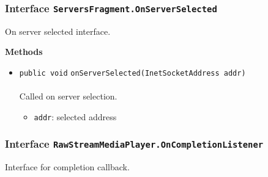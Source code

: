 \subsubsection{Interface \lstinline|ServersFragment.OnServerSelected|}
On server selected interface. \\
\noindent\begin{minipage}[t]{5cm}
\vspace{0.3em}
\hspace*{2em}
\vspace{0.3em}
\end{minipage}





\textbf{\sffamily Methods}
\begin{itemize}
\item \lstinline|public void| \lstinline|onServerSelected|\lstinline|(InetSocketAddress addr)|\\ \\[-0.6em]
Called on server selection.
\begin{itemize}
\item \lstinline|addr|: selected address
\end{itemize}



\end{itemize}

\subsubsection{Interface \lstinline|RawStreamMediaPlayer.OnCompletionListener|}
Interface for completion callback. \\
\noindent\begin{minipage}[t]{5cm}
\vspace{0.3em}
\hspace*{2em}
\vspace{0.3em}
\end{minipage}





